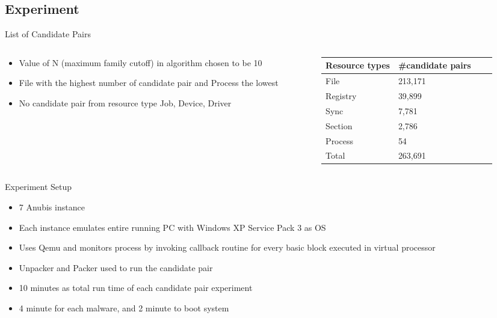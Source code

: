 \documentclass{beamer}
\begin{document}
\subsection{Experiment}
\label{sub:Experiment}
\begin{frame}[t]{List of Candidate Pairs}
\begin{columns}
\begin{column}{4.7cm}
\begin{itemize}
  \item Value of N (maximum family cutoff) in algorithm chosen to be 10
  \item File with the highest number of candidate pair and Process the lowest
  \item No candidate pair from resource type Job, Device, Driver
\end{itemize}
\end{column}
\begin{column}{5.3cm}
  \begin{tabular}{l l l l}
    \toprule
    Resource types & \#candidate pairs\\
    \midrule
    File & 213,171 \\
    Registry & 39,899 \\
    Sync & 7,781 \\
    Section & 2,786 \\
    Process & 54\\
    \bottomrule
    Total & 263,691\\
  \end{tabular}
\end{column}
\end{columns}
\end{frame}
\begin{frame}[t]{Experiment Setup}
  \begin{itemize}
    \item 7 Anubis instance
    \item Each instance emulates entire running PC with Windows XP Service Pack 3 as OS
    \item Uses Qemu and monitors process by invoking callback routine for every basic block executed in virtual processor
    \item Unpacker and Packer used to run the candidate pair
    \item 10 minutes as total run time of each candidate pair experiment
    \item 4 minute for each malware, and 2 minute to boot system
  \end{itemize}
\end{frame}
\end{document}
